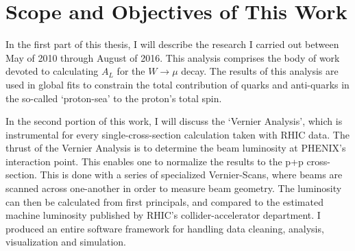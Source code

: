 \section{Scope and Objectives of This Work} 

In the first part of this thesis, I will describe the research I carried out
between May of 2010 through August of 2016.  This analysis comprises the body of
work devoted to calculating $A_L$ for the $W\rightarrow\mu$ decay. The results
of this analysis are used in global fits to constrain the total contribution of
quarks and anti-quarks in the so-called `proton-sea' to the proton's total spin.

In the second portion of this work, I will discuss the `Vernier Analysis', which
is instrumental for every single-cross-section calculation taken with RHIC data.
The thrust of the Vernier Analysis is to determine the beam luminosity at
PHENIX's interaction point. This enables one to normalize the results to the p+p
cross-section. This is done with a series of specialized Vernier-Scans, where
beams are scanned across one-another in order to measure beam geometry. The
luminosity can then be calculated from first principals, and compared to the
estimated machine luminosity published by RHIC's collider-accelerator
department. I produced an entire software framework for handling data cleaning,
analysis, visualization and simulation.
